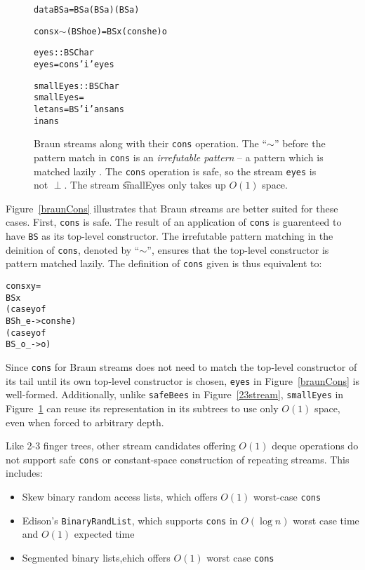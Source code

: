 \documentclass{llncs}
\begin{document}
\begin{figure}
\begin{alltt}
data BS a = BS a (BS a) (BS a)

cons x \(\sim\)(BS h o e) = BS x (cons h e) o

eyes :: BS Char
eyes = cons 'i' eyes

smallEyes :: BS Char
smallEyes = 
  let ans = BS 'i' ans ans 
  in ans
\end{alltt}
\caption{
Braun streams along with their {\tt cons} operation.
The ``$\sim$'' before the pattern match in {\tt cons} is an {\em irrefutable pattern} -- a pattern which is matched lazily \cite{haskellReport}.
The {\tt cons} operation is safe, so the stream {\tt eyes} is not $\perp$.
The stream {\t smallEyes} only takes up $O(1)$ space.
}
\label{braunCons}
\label{braunShare}
\end{figure}

Figure~\ref{braunCons} illustrates that Braun streams are better suited for these cases.
First, {\tt cons} is safe.
The result of an application of {\tt cons} is guarenteed to have {\tt BS} as its top-level constructor.
The irrefutable pattern matching in the deinition of {\tt cons}, denoted by ``$\sim$'', ensures that the top-level constructor is pattern matched lazily.
The definition of {\tt cons} given is thus equivalent to:

\begin{alltt}
cons x y =
  BS x
     (case y of
        BS h _ e -> cons h e)
     (case y of
        BS _ o _ -> o)
\end{alltt}

Since {\tt cons} for Braun streams does not need to match the top-level constructor of its tail until its own top-level constructor is chosen, {\tt eyes} in Figure~\ref{braunCons} is well-formed.
Additionally, unlike {\tt safeBees} in Figure~\ref{23stream}, {\tt smallEyes} in Figure~\ref{braunShare} can reuse its representation in its subtrees to use only $O(1)$ space, even when forced to arbitrary depth.

Like 2-3 finger trees, other stream candidates offering $O(1)$ deque operations do not support safe {\tt cons} or constant-space construction of repeating streams. This includes:

\begin{itemize}
\item Skew binary random access lists, which offers $O(1)$ worst-case {\tt cons} \cite{okasakiSkewLists}
\item Edison's \verb|BinaryRandList|, which supports {\tt cons} in $O(\log n)$ worst case time and $O(1)$ expected time \cite{holtersThesis}
\item Segmented binary lists,ehich offers $O(1)$ worst case {\tt cons} \cite{okasakiThesis}
\end{itemize}
\end{document}
